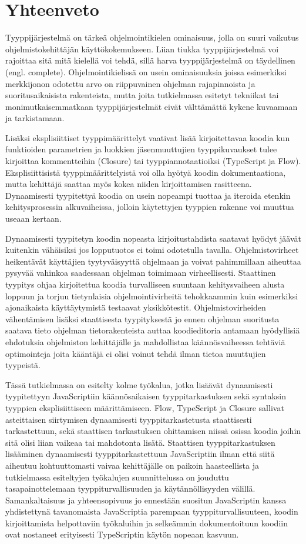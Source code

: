 \chapter{Yhteenveto}

Tyyppijärjestelmä on tärkeä ohjelmointikielen ominaisuus, jolla on suuri
vaikutus ohjelmistokehittäjän käyttökokemukseen.
Liian tiukka tyyppijärjestelmä voi rajoittaa sitä mitä kielellä voi tehdä,
sillä harva tyyppijärjestelmä on täydellinen (engl. complete).
Ohjelmointikielissä on usein ominaisuuksia joissa esimerkiksi merkkijonon
odotettu arvo on riippuvainen ohjelman rajapinnoista ja suoritusaikaisista
rakenteista, mutta joita tutkielmassa esitetyt tekniikat tai
monimutkaisemmatkaan tyyppijärjestelmät eivät välttämättä kykene
kuvaamaan ja tarkistamaan.

Lisäksi eksplisiittiset tyyppimäärittelyt vaativat lisää kirjoitettavaa
koodia kun funktioiden parametrien ja luokkien jäsenmuuttujien tyyppikuvaukset
tulee kirjoittaa kommentteihin (Closure) tai tyyppiannotaatioiksi
(TypeScript ja Flow).
Eksplisiittisistä tyyppimäärittelyistä voi olla hyötyä
koodin dokumentaationa, mutta kehittäjä saattaa myös kokea niiden
kirjoittamisen rasitteena. Dynaamisesti tyypitettyä koodia on usein
nopeampi tuottaa ja iteroida etenkin kehitysprosessin alkuvaiheissa, jolloin
käytettyjen tyyppien rakenne voi muuttua useaan kertaan. 

Dynaamisesti tyypitetyn koodin nopeasta kirjoitustahdista saatavat hyödyt jäävät kuitenkin
vähäisiksi jos lopputuotos ei toimi odotetulla tavalla. Ohjelmistovirheet heikentävät
käyttäjien tyytyväisyyttä ohjelmaan ja voivat pahimmillaan aiheuttaa
pysyvää vahinkoa saadessaan ohjelman toimimaan virheellisesti.
Staattinen tyypitys ohjaa kirjoitettua koodia turvalliseen suuntaan kehitysvaiheen alusta
loppuun ja torjuu tietynlaisia ohjelmointivirheitä tehokkaammin kuin
esimerkiksi ajonaikaista käyttäytymistä testaavat yksikkötestit.
Ohjelmistovirheiden vähentämisen lisäksi staattisesta tyypityksestä jo ennen ohjelman suoritusta
saatava tieto ohjelman tietorakenteista auttaa koodieditoria antamaan hyödyllisiä ehdotuksia
ohjelmiston kehittäjälle ja mahdollistaa käännösvaiheessa tehtäviä optimointeja
joita kääntäjä ei olisi voinut tehdä ilman tietoa muuttujien tyypeistä.

Tässä tutkielmassa on esitelty kolme työkalua, jotka lisäävät dynaamisesti
tyypitettyyn JavaScriptiin käännösaikaisen tyyppitarkastuksen sekä syntaksin
tyyppien eksplisiittiseen määrittämiseen. Flow, TypeScript ja Closure
sallivat asteittaisen siirtymisen dynaamisesti tyyppitarkastetusta staattisesti
tarkastettuun, sekä staattisen tarkastuksen ohittamisen niissä osissa koodia
joihin sitä olisi liian vaikeaa tai mahdotonta lisätä.
Staattisen tyyppitarkastuksen lisääminen dynaamisesti tyyppitarkastettuun
JavaScriptiin ilman että siitä aiheutuu kohtuuttomasti vaivaa kehittäjälle
on paikoin haasteellista ja tutkielmassa esiteltyjen työkalujen suunnittelussa
on jouduttu tasapainottelemaan tyyppiturvallisuuden ja käytännöllisyyden
välillä. Samankaltaisuus ja yhteensopivuus jo ennestään suositun JavaScriptin kanssa
yhdistettynä tavanomaista JavaScriptia parempaan tyyppiturvallisuuteen,
koodin kirjoittamista helpottaviin työkaluihin ja selkeämmin dokumentoituun
koodiin ovat nostaneet erityisesti TypeScriptin käytön nopeaan kasvuun.
